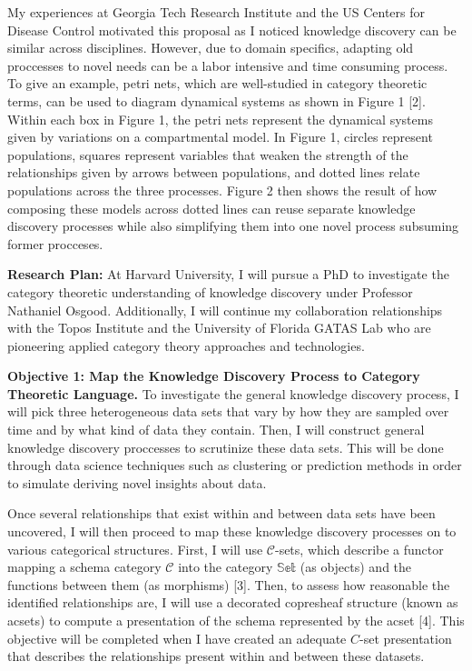 \documentclass[11pt]{extarticle}
\begin{document}
My experiences at Georgia Tech Research Institute and the US Centers for Disease Control motivated this proposal as I noticed knowledge discovery can be similar across disciplines.
However, due to domain specifics, adapting old proccesses to novel needs can be a labor intensive and time consuming process. 
To give an example, petri nets, which are well-studied in category theoretic terms, can be used to diagram dynamical systems as shown in Figure 1 [2].
Within each box in Figure 1, the petri nets represent the dynamical systems given by variations on a compartmental model.
In Figure 1, circles represent populations, squares represent variables that weaken the strength of the relationships given by arrows between populations, and dotted lines relate populations across the three processes.
Figure 2 then shows the result of how composing these models across dotted lines can reuse separate knowledge discovery processes while also simplifying them into one novel process subsuming former procceses.

\textbf{Research Plan:} At Harvard University, I will pursue a PhD to investigate the category theoretic understanding of knowledge discovery under Professor Nathaniel Osgood.
Additionally, I will continue my collaboration relationships with the Topos Institute and the University of Florida GATAS Lab who are pioneering applied category theory approaches and technologies.

\textbf{Objective 1: Map the Knowledge Discovery Process to Category Theoretic Language.} To investigate the general knowledge discovery process, I will pick three heterogeneous data sets that vary by how they are sampled over time and by what kind of data they contain. 
Then, I will construct general knowledge discovery proccesses to scrutinize these data sets.
This will be done through data science techniques such as clustering or prediction methods in order to simulate deriving novel insights about data.

Once several relationships that exist within and between data sets have been uncovered, I will then proceed to map these knowledge discovery processes on to various categorical structures.
First, I will use $\mathscr{C}$-sets, which describe a functor mapping a schema category $\mathscr{C}$ into the category $\mathbb{Set}$ (as objects) and the functions between them (as morphisms) [3].
Then, to assess how reasonable the identified relationships are, I will use a decorated copresheaf structure (known as acsets) to compute a presentation of the schema represented by the acset [4].
This objective will be completed when I have created an adequate $C$-set presentation that describes the relationships present within and between these datasets.
\end{document}
